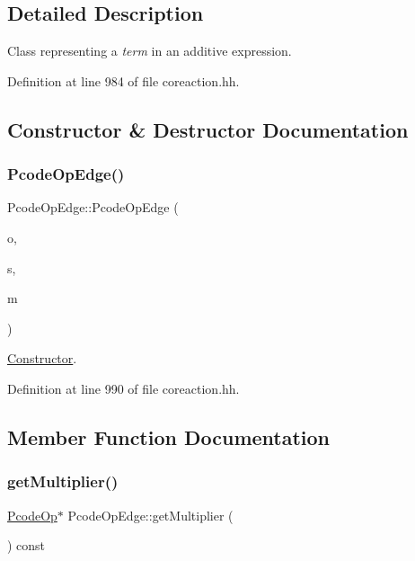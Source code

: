 \subsection{Detailed Description}
Class representing a {\itshape term} in an additive expression. 

Definition at line 984 of file coreaction.\+hh.



\subsection{Constructor \& Destructor Documentation}
\mbox{\label{class_pcode_op_edge_a550ff17880a333cf32f2adbc8957bf83}} 
\subsubsection{\texorpdfstring{PcodeOpEdge()}{PcodeOpEdge()}}
{\footnotesize\ttfamily Pcode\+Op\+Edge\+::\+Pcode\+Op\+Edge (\begin{DoxyParamCaption}\item[{\mbox{\hyperlink{class_pcode_op}{Pcode\+Op}} $\ast$}]{o,  }\item[{int4}]{s,  }\item[{\mbox{\hyperlink{class_pcode_op}{Pcode\+Op}} $\ast$}]{m }\end{DoxyParamCaption})\hspace{0.3cm}{\ttfamily [inline]}}



\mbox{\hyperlink{class_constructor}{Constructor}}. 



Definition at line 990 of file coreaction.\+hh.



\subsection{Member Function Documentation}
\mbox{\label{class_pcode_op_edge_aa4f87dadda848fc456bdfe550b89db10}} 
\subsubsection{\texorpdfstring{getMultiplier()}{getMultiplier()}}
{\footnotesize\ttfamily \mbox{\hyperlink{class_pcode_op}{Pcode\+Op}}$\ast$ Pcode\+Op\+Edge\+::get\+Multiplier (\begin{DoxyParamCaption}\item[{void}]{ }\end{DoxyParamCaption}) const\hspace{0.3cm}{\ttfamily [inline]}}




